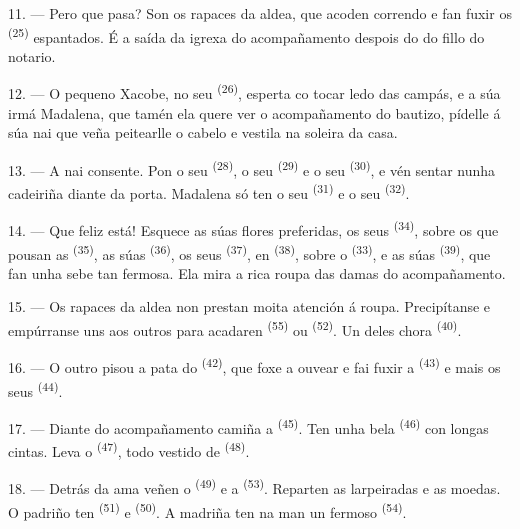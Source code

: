 11. --- Pero que pasa? Son os rapaces da aldea, que acoden correndo e fan fuxir os
 \textsuperscript{(25)} espantados. É a saída da igrexa do
acompañamento despois do  do fillo do notario.

12. --- O pequeno Xacobe, no seu  \textsuperscript{(26)}, esperta co tocar ledo
das campás, e a súa irmá Madalena, que tamén ela quere ver o acompañamento do bautizo, pídelle
á súa nai que veña peitearlle o cabelo e vestila na soleira da casa.

13. --- A nai consente. Pon o seu  \textsuperscript{(28)}, o seu
 \textsuperscript{(29)} e o seu 
\textsuperscript{(30)}, e vén sentar nunha cadeiriña diante da porta. Madalena só ten o seu
 \textsuperscript{(31)} e o seu  \textsuperscript{(32)}.

14. --- Que feliz está! Esquece as súas flores preferidas, os seus 
\textsuperscript{(34)}, sobre os que pousan as  \textsuperscript{(35)}, as
súas  \textsuperscript{(36)}, os seus
 \textsuperscript{(37)}, en 
\textsuperscript{(38)}, sobre o  \textsuperscript{(33)}, e as súas
 \textsuperscript{(39)}, que fan unha sebe tan fermosa. Ela mira a rica
roupa das damas do acompañamento.

15. --- Os rapaces da aldea non prestan moita atención á roupa. Precipítanse e empúrranse uns
aos outros para acadaren  \textsuperscript{(55)} ou
 \textsuperscript{(52)}. Un deles chora \textsuperscript{(40)}.

16. --- O outro pisou a pata do  \textsuperscript{(42)}, que foxe a ouvear e fai
fuxir a  \textsuperscript{(43)} e mais os seus
 \textsuperscript{(44)}.

\VUsaut{5.0mm}
\VUsaut{4.0mm}

17. --- Diante do acompañamento camiña a  \textsuperscript{(45)}. Ten unha
bela  \textsuperscript{(46)} con longas cintas. Leva o
 \textsuperscript{(47)}, todo vestido de 
\textsuperscript{(48)}.

18. --- Detrás da ama veñen o  \textsuperscript{(49)} e a
 \textsuperscript{(53)}. Reparten as larpeiradas e as moedas. O
padriño ten  \textsuperscript{(51)} e 
\textsuperscript{(50)}. A madriña ten na man un fermoso  \textsuperscript{(54)}.

